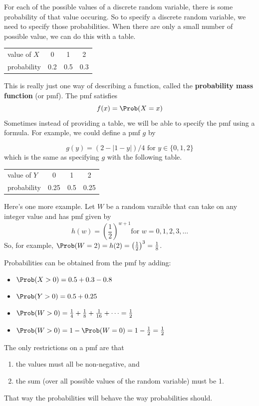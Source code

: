 \documentclass[twoside]{book}\usepackage[]{graphicx}\usepackage[]{xcolor}
\newcounter{example}[section]
\begin{document}
For each of the possible values of a discrete random variable, there is some
probability of that value occuring.  So to specify a discrete random variable,
we need to specify those probabilities.  When there are only a small number 
of possible value, we can do this with a table.

\begin{center}
\begin{tabular}{lccc}
\hline
value of $X$ & 0 & 1 & 2 \\
probability & 0.2 & 0.5 & 0.3 \\
\hline
\end{tabular}
\end{center}

This is really just one way of describing a function, called the 
\textbf{probability mass function} (or pmf).  The pmf satisfies
\[
f(x) = \Prob(X = x)
\]
Sometimes instead of providing a table, we will be able to specify
the pmf using a formula.  For example, we could define a pmf $g$ by

\[ g(y) = (2 - |1-y|) / 4 \mbox{ for $y \in \{0, 1, 2\}$} \]
which is the same as specifying $g$ with the following table.

\begin{center}
\begin{tabular}{lccc}
\hline
value of $Y$ & 0 & 1 & 2 \\
probability & 0.25 & 0.5 & 0.25 \\
\hline
\end{tabular}
\end{center}

Here's one more example.  Let $W$ be a random varaible that can take on any integer
value and has pmf given by
\[
h(w) = \left(\frac{1}{2}\right)^{w+1} \mbox {for $w = 0, 1, 2, 3, \dots$}
\]
So, for example, $\Prob(W = 2) = h(2) = \left(\frac12 \right)^3 = \frac18$.

Probabilities can be obtained from the pmf by adding:


\begin{itemize}
\item
$\Prob( X > 0 ) = 0.5 + 0.3 - 0.8$
\item
$\Prob( Y > 0) = 0.5 + 0.25$
\item
$\Prob(W > 0) = \frac14 + \frac18 + \frac1{16} + \cdots = \frac12$
\item
$\Prob(W > 0) = 1 - \Prob(W = 0) = 1 - \frac{1}{2} = \frac{1}{2}$
\end{itemize}

The only restrictions on a pmf are that 
\begin{enumerate}
\item
the values must all be non-negative, and 
\item
the sum (over all possible values of the random variable) must be 1.
\end{enumerate}
That way the probabilities will behave the way probabilities should.
\end{document}

